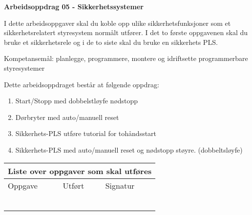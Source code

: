 
\noindent
{\bf Arbeidsoppdrag 05 - Sikkerhetssystemer}

\vskip 5pt

I dette arbeidsoppgaver skal du koble opp ulike sikkerhetsfunksjoner som et sikkerhetsrelatert styresystem normålt utfører. I det to første oppgavenen skal du bruke et sikkerhetsrele og i de to siste skal du bruke en sikkerhets PLS. 

Kompetansemål:
planlegge, programmere, montere og idriftsette programmerbare styresystemer

Dette arbeidsoppdraget består at følgende oppdrag:
\begin{enumerate}
	\item Start/Stopp med dobbelstløyfe nødstopp
	\item Dørbryter med auto/manuell reset
	\item Sikkerhets-PLS utføre tutorial for tohåndsstart	 
	\item Sikkerhets-PLS med auto/manuell reset og nødstopp støyre. (dobbeltsløyfe) 
\end{enumerate}

\begin{center}
\begin{tabular}{ | m{8cm} | m{1cm}| m{2cm} | } 
\hline
\multicolumn{3}{|c|}{Liste over oppgaver som skal utføres} \\
	\hline
	Oppgave	& Utført & Signatur \\ 
	\hline
	\hline
	& & \\ 
	\hline
	& & \\ 
	\hline
	& & \\ 
	\hline
	& & \\ 
	\hline
	& & \\ 
	\hline
	& & \\ 
	\hline
\end{tabular}
\end{center}



